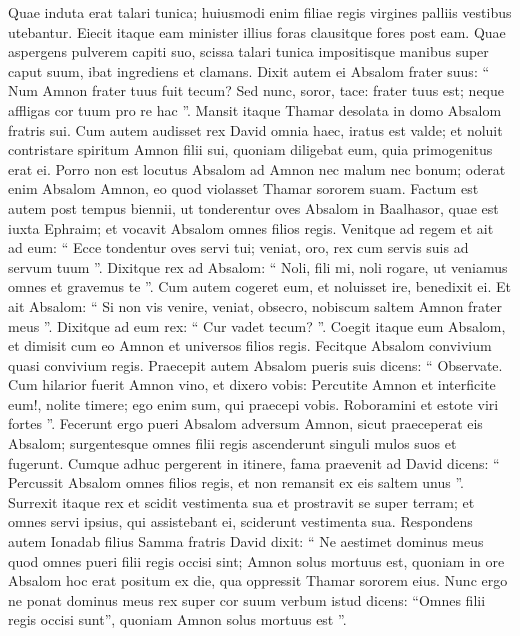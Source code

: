 \begin{biblechapter}
\begin{biblechapter}
\begin{biblechapter}
\begin{biblechapter}
\begin{biblechapter}
\begin{biblechapter}
\begin{biblechapter}
\begin{biblechapter}
\begin{biblechapter}
\begin{biblechapter}
\begin{biblechapter}
\begin{biblechapter}
\begin{biblechapter}
\verse Quae induta erat talari tunica; huiusmodi enim filiae regis virgines palliis vestibus utebantur. Eiecit itaque eam minister illius foras clausitque fores post eam.
 \verse Quae aspergens pulverem capiti suo, scissa talari tunica impositisque manibus super caput suum, ibat ingrediens et clamans. 
\verse Dixit autem ei Absalom frater suus: “ Num Amnon frater tuus fuit tecum? Sed nunc, soror, tace: frater tuus est; neque affligas cor tuum pro re hac ”. Mansit itaque Thamar desolata in domo Absalom fratris sui.
 \verse Cum autem audisset rex David omnia haec, iratus est valde; et noluit contristare spiritum Amnon filii sui, quoniam diligebat eum, quia primogenitus erat ei. 
\verse Porro non est locutus Absalom ad Amnon nec malum nec bonum; oderat enim Absalom Amnon, eo quod violasset Thamar sororem suam.
 \verse Factum est autem post tempus biennii, ut tonderentur oves Absalom in Baalhasor, quae est iuxta Ephraim; et vocavit Absalom omnes filios regis. 
\verse Venitque ad regem et ait ad eum: “ Ecce tondentur oves servi tui; veniat, oro, rex cum servis suis ad servum tuum ”. 
\verse Dixitque rex ad Absalom: “ Noli, fili mi, noli rogare, ut veniamus omnes et gravemus te ”. Cum autem cogeret eum, et noluisset ire, benedixit ei. 
\verse Et ait Absalom: “ Si non vis venire, veniat, obsecro, nobiscum saltem Amnon frater meus ”. Dixitque ad eum rex: “ Cur vadet tecum? ”. 
\verse Coegit itaque eum Absalom, et dimisit cum eo Amnon et universos filios regis.
 Fecitque Absalom convivium quasi convivium regis. 
\verse Praecepit autem Absalom pueris suis dicens: “ Observate. Cum hilarior fuerit Amnon vino, et dixero vobis: Percutite Amnon et interficite eum!, nolite timere; ego enim sum, qui praecepi vobis. Roboramini et estote viri fortes ”. 
\verse Fecerunt ergo pueri Absalom adversum Amnon, sicut praeceperat eis Absalom; surgentesque omnes filii regis ascenderunt singuli mulos suos et fugerunt.
 \verse Cumque adhuc pergerent in itinere, fama praevenit ad David dicens: “ Percussit Absalom omnes filios regis, et non remansit ex eis saltem unus ”. 
 \verse Surrexit itaque rex et scidit vestimenta sua et prostravit se super terram; et omnes servi ipsius, qui assistebant ei, sciderunt vestimenta sua. 
\verse Respondens autem Ionadab filius Samma fratris David dixit: “ Ne aestimet dominus meus quod omnes pueri filii regis occisi sint; Amnon solus mortuus est, quoniam in ore Absalom hoc erat positum ex die, qua oppressit Thamar sororem eius. 
 \verse Nunc ergo ne ponat dominus meus rex super cor suum verbum istud dicens: “Omnes filii regis occisi sunt”, quoniam Amnon solus mortuus est ”. 

\end{biblechapter}
\end{biblechapter}
\end{biblechapter}
\end{biblechapter}
\end{biblechapter}
\end{biblechapter}
\end{biblechapter}
\end{biblechapter}
\end{biblechapter}
\end{biblechapter}
\end{biblechapter}
\end{biblechapter}
\end{biblechapter}
